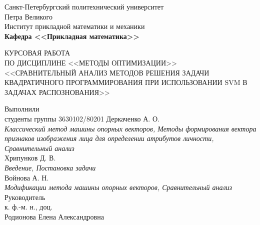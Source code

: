 \documentclass[main.tex]{subfiles}
\begin{document}
\begin{titlepage}
\begin{center}
	\begin{large}
		Санкт-Петербургский политехнический университет\\ Петра Великого\\		
		\vspace{\baselineskip}
		Институт прикладной математики и механики\\
		\textbf{Кафедра <<Прикладная математика>>}\\
	\end{large}
	\vfill
	\Large{{КУРСОВАЯ РАБОТА\\
	ПО ДИСЦИПЛИНЕ <<МЕТОДЫ ОПТИМИЗАЦИИ>>\\ <<СРАВНИТЕЛЬНЫЙ АНАЛИЗ МЕТОДОВ РЕШЕНИЯ ЗАДАЧИ КВАДРАТИЧНОГО ПРОГРАММИРОВАНИЯ ПРИ ИСПОЛЬЗОВАНИИ SVM В ЗАДАЧАХ РАСПОЗНОВАНИЯ>>}}
\end{center}
\vfill
\flushleft
Выполнили\\
студенты группы 3630102/80201
\flushright
Деркаченко А. О.\\
\textit{Классический метод машины опорных векторов, Методы формирования вектора признаков изображения лица для определении атрибутов личности, Сравнительный анализ}\\
Хрипунков Д. В.\\
\textit{Введение, Постановка задачи}\\
Войнова А. Н.\\
\textit{Модификации метода машины опорных векторов, Сравнительный анализ}\\
\flushleft
Руководитель\\
к. ф.-м. н., доц.\\
\flushright
Родионова Елена Александровна
\vfill
{}
\end{titlepage}
\end{document}
